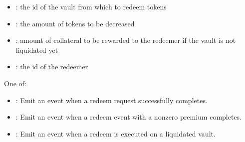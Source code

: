 \documentclass[a4paper,10pt,english]{sphinxmanual}
\begin{document}

\begin{itemize}
\item {} 
: the id of the vault from which to redeem tokens

\item {} 
: the amount of tokens to be decreased

\item {} 
: amount of collateral to be rewarded to the redeemer if the vault is not liquidated yet

\item {} 
: the id of the redeemer

\end{itemize}


One of:
\begin{itemize}
\item {} 
: Emit an event when a redeem request successfully completes.

\item {} 
: Emit an event when a redeem event with a non\sphinxhyphen{}zero premium completes.

\item {} 
: Emit an event when a redeem is executed on a liquidated vault.

\end{itemize}
\end{document}
